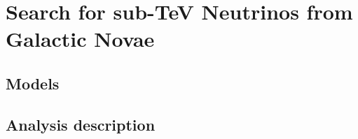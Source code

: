 \chapter{Search for sub-TeV Neutrinos from Galactic Novae}
\label{sec:Novae}



\section{Models}
\label{sec:Novae:models}


\section{Analysis description}
\label{sec:Novae:analysis}